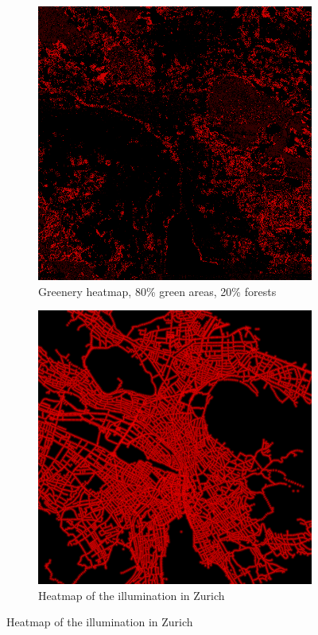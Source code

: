 \documentclass[letterpaper]{article}
\begin{document}
\begin{figure}
    \centering
    \begin{subfigure}{.22\textwidth}
        \centering
        \includegraphics[width=.95\linewidth]{images/greenery/combined_heatmap_4_to_1.png}
        \caption[width=.2\textwidth]{Greenery heatmap, 80\% green areas, 20\% forests}
    \end{subfigure}%
    \begin{subfigure}{.22\textwidth}
        \centering
        \includegraphics[width=.95\linewidth]{images/results/illumination_heatmap_70.png}
        \caption[width=.2\textwidth]{Heatmap of the illumination in Zurich}
    \end{subfigure}


\end{figure}
\end{document}
